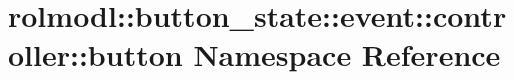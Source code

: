 \hypertarget{namespacerolmodl_1_1button__state_1_1event_1_1controller_1_1button}{}\section{rolmodl\+::button\+\_\+state\+::event\+::controller\+::button Namespace Reference}
\label{namespacerolmodl_1_1button__state_1_1event_1_1controller_1_1button}
